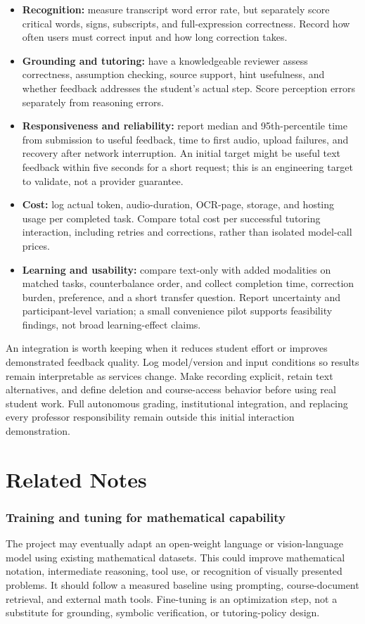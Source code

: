 \documentclass[11pt]{article}
\begin{document}
\begin{itemize}
\item \textbf{Recognition:} measure transcript word error rate, but separately score critical words, signs, subscripts, and full-expression correctness. Record how often users must correct input and how long correction takes.
\item \textbf{Grounding and tutoring:} have a knowledgeable reviewer assess correctness, assumption checking, source support, hint usefulness, and whether feedback addresses the student's actual step. Score perception errors separately from reasoning errors.
\item \textbf{Responsiveness and reliability:} report median and 95th-percentile time from submission to useful feedback, time to first audio, upload failures, and recovery after network interruption. An initial target might be useful text feedback within five seconds for a short request; this is an engineering target to validate, not a provider guarantee.
\item \textbf{Cost:} log actual token, audio-duration, OCR-page, storage, and hosting usage per completed task. Compare total cost per successful tutoring interaction, including retries and corrections, rather than isolated model-call prices.
\item \textbf{Learning and usability:} compare text-only with added modalities on matched tasks, counterbalance order, and collect completion time, correction burden, preference, and a short transfer question. Report uncertainty and participant-level variation; a small convenience pilot supports feasibility findings, not broad learning-effect claims.
\end{itemize}

An integration is worth keeping when it reduces student effort or improves demonstrated feedback quality. Log model/version and input conditions so results remain interpretable as services change. Make recording explicit, retain text alternatives, and define deletion and course-access behavior before using real student work. Full autonomous grading, institutional integration, and replacing every professor responsibility remain outside this initial interaction demonstration.

\clearpage
\part{Related Notes}

\section{Training and tuning for mathematical capability}
The project may eventually adapt an open-weight language or vision-language model using existing mathematical datasets. This could improve mathematical notation, intermediate reasoning, tool use, or recognition of visually presented problems. It should follow a measured baseline using prompting, course-document retrieval, and external math tools. Fine-tuning is an optimization step, not a substitute for grounding, symbolic verification, or tutoring-policy design.
\end{document}
